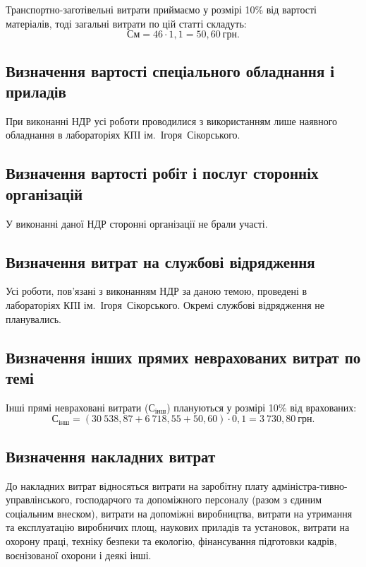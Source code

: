 \documentclass[a4paper,fontsize=14bp,ukrainian]{extreport}
\begin{document}


Транспортно-заготівельні витрати приймаємо у розмірі 10\% від вартості матеріалів, тоді загальні витрати по цій статті складуть:
\begin{equation*}
\text{См}= 46 \cdot 1,1 = 50,60~\text{грн}.
\end{equation*}

\subsection{Визначення вартості спеціального обладнання і приладів}

При виконанні НДР усі роботи проводилися з використанням лише наявного обладнання в лабораторіях КПІ ім.~Ігоря~Сікорського.

\subsection{Визначення вартості робіт і послуг сторонніх організацій}

У виконанні даної НДР сторонні організації не брали участі.

\subsection{Визначення витрат на службові відрядження}

Усі роботи, пов’язані з виконанням НДР за даною темою, проведені в лабораторіях КПІ ім.~Ігоря~Сікорського. Окремі службові відрядження не планувались.

\subsection{Визначення інших прямих неврахованих витрат по темі}

Інші прямі невраховані витрати ($\text{С}_{\text{інш}}$) плануються у розмірі 10\% від врахованих:
\begin{equation*}
\text{С}_{\text{інш}}=(30~538,87+6~718,55+50,60)\cdot 0,1 = 3~730,80~\text{грн}.
\end{equation*}

\subsection{Визначення накладних витрат}

До накладних витрат відносяться витрати на заробітну плату адміністра-тивно-управлінського, господарчого та допоміжного персоналу (разом з єдиним соціальним внеском), витрати на допоміжні виробництва, витрати на утримання та експлуатацію виробничих площ, наукових приладів та установок, витрати на охорону праці, техніку безпеки та екологію, фінансування підготовки кадрів, воєнізованої охорони і деякі інші.
\end{document}
